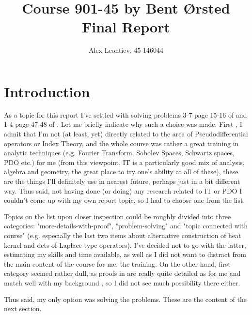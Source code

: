 \documentclass[10pt]{article} %
\title{Course 901-45 by Bent Ørsted\\Final Report}
\author{Alex Leontiev, 45-146044}
\begin{document}
\begin{CJK}{UTF8}{bsmi}
\maketitle
\end{CJK}
\section{Introduction}
As a topic for this report I've settled with solving problems 3-7 page 15-16 of \cite{met-sobolev}
and 1-4 page 47-48 of \cite{met-fa}. Let me briefly indicate why such a choice was made. First
, I admit that I'm not (at least, yet) directly related to the area of Pseudodifferential operators or Index Theory, and the whole
course was rather a great training in analytic techniques (e.g. Fourier Transform, Sobolev Spaces, Schwartz spaces, PDO etc.) for me
(from this viewpoint, IT is a particularly good mix of analysis, algebra and geometry, the great place to try one's ability at all
of these), these are the things I'll definitely use in nearest future, perhaps just in a bit different way. Thus said, not having
done (or doing) any research related to IT or PDO I couldn't come up with my own report topic, so I had to choose one from the list.

Topics on the list upon closer inspection could be roughly divided into three categories: "more-details-with-proof", "problem-solving"
and "topic connected with course" (e.g. especially the last two items about alternative construction of heat kernel and dets of
Laplace-type operators). I've decided not to go with the latter, estimating my skills and time available, as well as I did not want
to distract from the main content of the course for me: the training. On the other hand, first category seemed rather dull, as
proofs in \cite{gilkey} are really quite detailed as for me and match well with my background
, so I did not see much possibility there either.

Thus said, my only option was solving the problems. These are the content of the next section.
\end{document}
